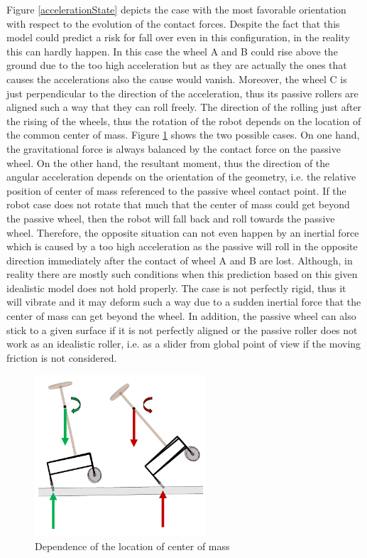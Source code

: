 \documentclass[12pt,english,twoside]{article}
\begin{document}
Figure \ref{accelerationState} depicts the case with the most favorable orientation with respect to the evolution of the contact forces. Despite the fact that this model could predict a risk for fall over even in this configuration, in the reality this can hardly happen. In this case the wheel A and B could rise above the ground due to the too high acceleration but as they are actually the ones that causes the accelerations also the cause would vanish. Moreover, the wheel C is just perpendicular to the direction of the acceleration, thus its passive rollers are aligned such a way that they can roll freely. The direction of the rolling just after the rising of the wheels, thus the rotation of the robot depends on the location of the common center of mass. Figure \ref{fallover_ppt} shows the two possible cases. On one hand, the gravitational force is always balanced by the contact force on the passive wheel. On the other hand, the resultant moment, thus the direction of the angular acceleration depends on the orientation of the geometry, i.e. the relative position of center of mass referenced to the passive wheel contact point. If the robot case does not rotate that much that the center of mass could get beyond the passive wheel, then the robot will fall back and roll towards the passive wheel. Therefore, the opposite situation can not even happen by an inertial force which is caused by a too high acceleration as the passive will roll in the opposite direction immediately after the contact of wheel A and B are lost. Although, in reality there are mostly such conditions when this prediction based on this given idealistic model does not hold properly. The case is not perfectly rigid, thus it will vibrate and it may deform such a way due to a sudden inertial force that the center of mass can get beyond the wheel. In addition, the passive wheel can also stick to a given surface if it is not perfectly aligned or the passive roller does not work as an idealistic roller, i.e. as a slider from global point of view if the moving friction is not considered.
\begin{figure}[htb!]
	\centering
	\includegraphics[height=6cm]{figures/fallover_ppt}
	\caption{Dependence of the location of center of mass}
	\label{fallover_ppt}
\end{figure}
\end{document}
